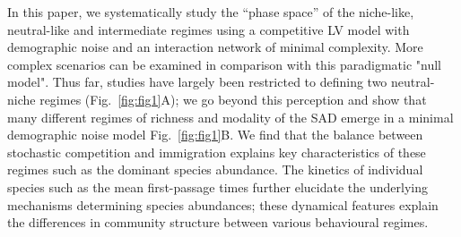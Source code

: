 \documentclass[9pt,twocolumn,twoside,lineno]{pnas-new}
\begin{document}
In this paper, we systematically study the ``phase space'' of the niche-like, neutral-like and intermediate regimes using a competitive LV model with demographic noise and an interaction network of minimal complexity. 
More complex scenarios can be examined in comparison with this paradigmatic "null model".%
Thus far, studies have largely been restricted to defining two neutral-niche regimes (Fig.~\ref{fig:fig1}A); we go beyond this perception and show that many different regimes of richness and modality of the SAD emerge in a minimal demographic noise model Fig.~\ref{fig:fig1}B.
We find that the balance between stochastic competition and immigration explains key characteristics of these regimes such as the dominant species abundance. %
The kinetics of individual species such as the mean first-passage times further elucidate the underlying mechanisms determining species abundances; these dynamical features explain the differences in community structure between various behavioural regimes.


\end{document}
